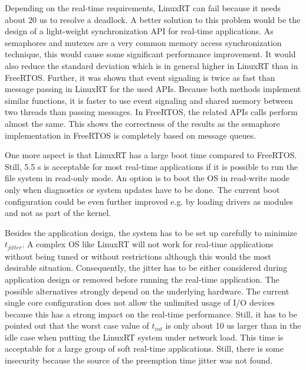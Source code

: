 Depending on the real-time requirements, LinuxRT can fail because it needs about 20 us to resolve a deadlock. 
A better solution to this problem would be the design of a light-weight synchronization \ac{API} for real-time applications.
As semaphores and mutexes are a very common memory access synchronization technique, this would cause some significant performance improvement.
It would also reduce the standard deviation which is in general higher in LinuxRT than in FreeRTOS.
Further, it was shown that event signaling is twice as fast than message passing in LinuxRT for the used \acp{API}.
Because both methods implement similar functions, it is faster to use event signaling and shared memory between two threads than passing messages.
In FreeRTOS, the related \acp{API} calls perform almost the same.
This shows the correctness of the results as the semaphore implementation in FreeRTOS is completely based on message queues.
\par
One more aspect is that LinuxRT has a large boot time compared to FreeRTOS. 
Still, 5.5 s is acceptable for most real-time applications if it is possible to run the file system in read-only mode.
An option is to boot the \ac{OS} in read-write mode only when diagnostics or system updates have to be done.
The current boot configuration could be even further improved e.g. by loading drivers as modules and not as part of the kernel.
\par
Besides the application design, the system has to be set up carefully to minimize $t_{jitter}$. 
A complex \ac{OS} like LinuxRT will not work for real-time applications without being tuned or without restrictions although this would the most desirable situation.
Consequently, the jitter has to be either considered during application design or removed before running the real-time application.
The possible alternatives strongly depend on the underlying hardware.
The current single core configuration does not allow the unlimited usage of \ac{I/O} devices because this has a strong impact on the real-time performance. 
Still, it has to be pointed out that the worst case value of $t_{int}$ is only about 10 us larger than in the idle case when putting the LinuxRT system under network load. 
This time is acceptable for a large group of soft real-time applications.
Still, there is some insecurity because the source of the preemption time jitter was not found. 
